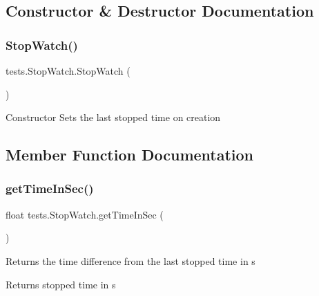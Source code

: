 \subsection{Constructor \& Destructor Documentation}
\mbox{\label{classtests_1_1_stop_watch_a5aa96180c2b141e1970b29c4c52f0144}} 
\subsubsection{\texorpdfstring{Stop\+Watch()}{StopWatch()}}
{\footnotesize\ttfamily tests.\+Stop\+Watch.\+Stop\+Watch (\begin{DoxyParamCaption}{ }\end{DoxyParamCaption})}

Constructor Sets the last stopped time on creation 

\subsection{Member Function Documentation}
\mbox{\label{classtests_1_1_stop_watch_a1603703f4833f56b1a7a3fa1fe1a5535}} 
\subsubsection{\texorpdfstring{get\+Time\+In\+Sec()}{getTimeInSec()}}
{\footnotesize\ttfamily float tests.\+Stop\+Watch.\+get\+Time\+In\+Sec (\begin{DoxyParamCaption}{ }\end{DoxyParamCaption})}

Returns the time difference from the last stopped time in s \begin{DoxyReturn}{Returns}
stopped time in s 
\end{DoxyReturn}
\mbox{\label{classtests_1_1_stop_watch_a0e04959e839d96d5e64c51d7818455a2}} 
